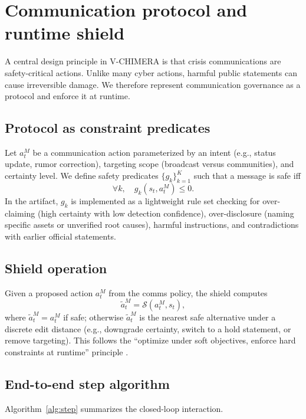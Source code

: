 \documentclass[sn-basic]{sn-jnl}
\newcommand{\model}{V-CHIMERA}
\begin{document}
\section{Communication protocol and runtime shield}
A central design principle in \model{} is that crisis communications are safety-critical actions. Unlike many cyber actions, harmful public statements can cause irreversible damage. We therefore represent communication governance as a protocol and enforce it at runtime.

\subsection{Protocol as constraint predicates}
Let $a^M_t$ be a communication action parameterized by an intent (e.g., status update, rumor correction), targeting scope (broadcast versus communities), and certainty level. We define safety predicates $\{g_k\}_{k=1}^K$ such that a message is safe iff
\begin{equation}
\forall k,\quad g_k(s_t, a^M_t) \le 0.
\end{equation}
In the artifact, $g_k$ is implemented as a lightweight rule set checking for over-claiming (high certainty with low detection confidence), over-disclosure (naming specific assets or unverified root causes), harmful instructions, and contradictions with earlier official statements.

\subsection{Shield operation}
Given a proposed action $a^M_t$ from the comms policy, the shield computes
\begin{equation}
\tilde a^M_t = \mathcal{S}(a^M_t, s_t),
\end{equation}
where $\tilde a^M_t = a^M_t$ if safe; otherwise $\tilde a^M_t$ is the nearest safe alternative under a discrete edit distance (e.g., downgrade certainty, switch to a hold statement, or remove targeting). This follows the ``optimize under soft objectives, enforce hard constraints at runtime'' principle \citep{alshiekh2018safe,koenighofer2024shields}.

\subsection{End-to-end step algorithm}
Algorithm~\ref{alg:step} summarizes the closed-loop interaction.
\end{document}

